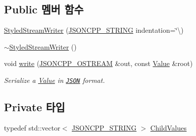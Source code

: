 \subsection*{Public 멤버 함수}
\begin{DoxyCompactItemize}
\item 
\hyperlink{class_json_1_1_styled_stream_writer_a5e41c4e40f11266046bd0ea8f8f5a75e}{Styled\+Stream\+Writer} (\hyperlink{json_8h_a1e723f95759de062585bc4a8fd3fa4be}{J\+S\+O\+N\+C\+P\+P\+\_\+\+S\+T\+R\+I\+NG} indentation=\char`\"{}\textbackslash{})
\item 
\hyperlink{class_json_1_1_styled_stream_writer_a17444a59f617970279714e97b0ddfa46}{$\sim$\+Styled\+Stream\+Writer} ()
\item 
void \hyperlink{class_json_1_1_styled_stream_writer_a5d89d984fe675641e42c4370cd247774}{write} (\hyperlink{json_8h_a37a25be5fca174927780caeb280094ce}{J\+S\+O\+N\+C\+P\+P\+\_\+\+O\+S\+T\+R\+E\+AM} \&out, const \hyperlink{class_json_1_1_value}{Value} \&root)
\begin{DoxyCompactList}\small\item\em Serialize a \hyperlink{class_json_1_1_value}{Value} in \href{http://www.json.org}{\tt J\+S\+ON} format. \end{DoxyCompactList}\end{DoxyCompactItemize}
\subsection*{Private 타입}
\begin{DoxyCompactItemize}
\item 
typedef std\+::vector$<$ \hyperlink{json_8h_a1e723f95759de062585bc4a8fd3fa4be}{J\+S\+O\+N\+C\+P\+P\+\_\+\+S\+T\+R\+I\+NG} $>$ \hyperlink{class_json_1_1_styled_stream_writer_a259bf9d99847b2ea64ec9c6dd441944e}{Child\+Values}
\end{DoxyCompactItemize}

